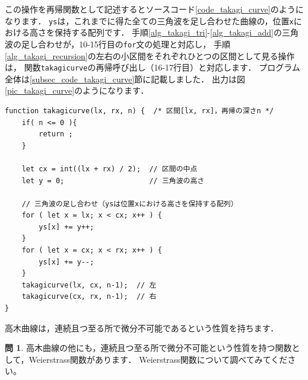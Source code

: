 \documentclass[dvipdfmx]{jsarticle}
\theoremstyle{definition}
\newtheorem{question}{問}[section]
\begin{document}
%
この操作を再帰関数として記述するとソースコード\ref{code_takagi_curve}のようになります．
\verb|ys|は，これまでに得た全ての三角波を足し合わせた曲線の，位置\verb|x|における高さを保持する配列です．
手順\ref{alg_takagi_tri}-\ref{alg_takagi_add}の三角波の足し合わせが，10-15行目の\verb|for|文の処理と対応し，
手順\ref{alg_takagi_recursion}の左右の小区間をそれぞれひとつの区間として見る操作は，
関数\verb|takagicurve|の再帰呼び出し（16-17行目）と対応します．
%
プログラム全体は\ref{subsec_code_takagi_curve}節に記載しました．
出力は図\ref{pic_takagi_curve}のようになります．
%
\begin{lstlisting}[caption=高木曲線を描く再帰関数, label=code_takagi_curve]
function takagicurve(lx, rx, n) {  /* 区間[lx, rx]，再帰の深さn */
    if( n <= 0 ){
        return ;
    }

    let cx = int((lx + rx) / 2);  // 区間の中点
    let y = 0;                    // 三角波の高さ

    // 三角波の足し合わせ（ysは位置xにおける高さを保持する配列）
    for ( let x = lx; x < cx; x++ ) {
        ys[x] += y++;
    }
    for ( let x = cx; x < rx; x++ ) {
        ys[x] += y--;
    }
    takagicurve(lx, cx, n-1);  // 左
    takagicurve(cx, rx, n-1);  // 右
}
\end{lstlisting}

高木曲線は，連続且つ至る所で微分不可能であるという性質を持ちます．

\begin{question}
    高木曲線の他にも，連続且つ至る所で微分不可能という性質を持つ関数として，Weierstrass関数があります．
    Weierstrass関数について調べてみてください。
\end{question}

\end{document}

